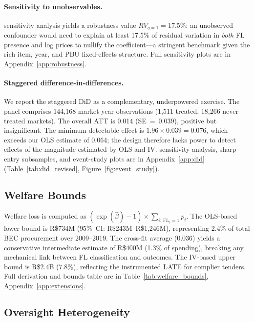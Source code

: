 \paragraph{Sensitivity to unobservables.}
\citet{cinelli2020making} sensitivity analysis yields a robustness
value $RV_{q=1} = 17.5\%$: an unobserved confounder would need to
explain at least 17.5\% of residual variation in \emph{both} FL
presence and log prices to nullify the coefficient---a stringent
benchmark given the rich item, year, and PBU fixed-effects structure.
Full sensitivity plots are in Appendix~\ref{app:robustness}.

\paragraph{Staggered difference-in-differences.}
We report the \citet{callaway2021difference} staggered DiD as a
complementary, underpowered exercise. The panel comprises 144,168
market-year observations (1,511 treated, 18,266 never-treated
markets). The overall ATT is 0.014 (SE~=~0.039), positive but
insignificant. The minimum detectable effect is
$1.96\times 0.039 = 0.076$, which exceeds our OLS estimate of 0.064;
the design therefore lacks power to detect effects of the magnitude
estimated by OLS and IV. \citet{rambachan2023more} sensitivity
analysis, sharp-entry subsamples, and event-study plots are in
Appendix~\ref{app:did} (Table~\ref{tab:did_revised},
Figure~\ref{fig:event_study}).

\subsection{Welfare Bounds}
\label{sec:welfare}

Welfare loss is computed as $(\exp(\hat{\beta})-1)\times\sum_{i:\,\text{FL}_i=1}p_i$.
The OLS-based lower bound is R\$734M (95\%~CI: R\$243M--R\$1,246M),
representing 2.4\% of total BEC procurement over 2009--2019. The
cross-fit average (0.036) yields a conservative intermediate estimate
of R\$400M (1.3\% of spending), breaking any mechanical link between
FL classification and outcomes. The IV-based upper bound is
R\$2.4B (7.8\%), reflecting the instrumented LATE for complier
tenders. Full derivation and bounds table are in
Table~\ref{tab:welfare_bounds}, Appendix~\ref{app:extensions}.

\subsection{Oversight Heterogeneity}

